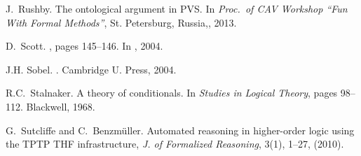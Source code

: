\documentclass{llncs}
\begin{document}
\begin{thebibliography}{10}
J.~Rushby.
\newblock The ontological argument in {PVS}.
\newblock In {\em Proc.~of CAV Workshop ``Fun With Formal Methods''}, St.
  Petersburg, Russia,, 2013.

D.~Scott.
, pages 145--146.
\newblock In  \cite{sobel2004logic}, 2004.

J.H. Sobel.
.
\newblock Cambridge U. Press, 2004.

R.C.~Stalnaker.
\newblock A theory of conditionals.
\newblock In {\em Studies in Logical Theory}, pages
98--112. Blackwell, 1968.

G.~Sutcliffe and C.~Benzm{\"u}ller.
\newblock Automated reasoning in higher-order logic
  using the {TPTP THF} infrastructure, {\em J. of Formalized Reasoning},
  3(1),  1--27, (2010).



\end{thebibliography}
\end{document}

